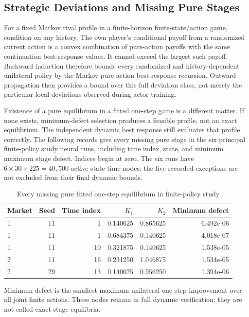 \subsection{Strategic Deviations and Missing Pure Stages}\label{supp:r8-games}
For a fixed Markov rival profile in a finite-horizon finite-state/action game, condition on any history. The own player's conditional payoff from a randomized current action is a convex combination of pure-action payoffs with the same continuation best-response values. It cannot exceed the largest such payoff. Backward induction therefore bounds every randomized and history-dependent unilateral policy by the Markov pure-action best-response recursion. Outward propagation then provides a bound over this full deviation class, not merely the particular local deviations observed during actor training.

Existence of a pure equilibrium in a fitted one-step game is a different matter. If none exists, minimum-defect selection produces a feasible profile, not an exact equilibrium. The independent dynamic best response still evaluates that profile correctly. The following records give every missing pure stage in the six principal finite-policy study neural runs, including time index, state, and minimum maximum stage defect. Indices begin at zero. The six runs have $6\times30\times225=40{,}500$ active state-time nodes; the five recorded exceptions are not excluded from their final dynamic bounds.

\begin{table}[htbp]\centering
\caption{Every missing pure fitted one-step equilibrium in finite-policy study}
\begin{small}\begin{tabular}{lrrrrr}
\toprule
Market & Seed & Time index & $K_1$ & $K_2$ & Minimum defect \\
\midrule
1 & 11 & 1 & 0.140625 & 0.865625 & 6.492e-06 \\
1 & 11 & 1 & 0.684375 & 0.140625 & 4.018e-07 \\
1 & 11 & 10 & 0.321875 & 0.140625 & 1.538e-05 \\
2 & 11 & 16 & 0.231250 & 1.046875 & 1.534e-05 \\
2 & 29 & 13 & 0.140625 & 0.956250 & 1.394e-06 \\
\bottomrule\end{tabular}\end{small}
\par\smallskip\begin{minipage}{0.96\linewidth}\footnotesize Minimum defect is the smallest maximum unilateral one-step improvement over all joint finite actions. These nodes remain in full dynamic verification; they are not called exact stage equilibria.\end{minipage}
\end{table}


